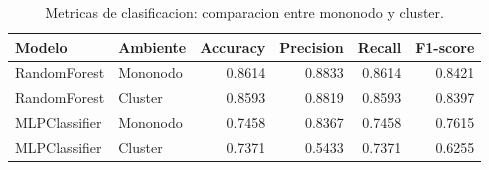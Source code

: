 \begin{table}[H]
    \centering
    \caption{Metricas de clasificacion: comparacion entre mononodo y cluster.}
    \label{tab:classification}
    \begin{tabular}{llrrrr}
        \toprule
        \textbf{Modelo} & \textbf{Ambiente} & \textbf{Accuracy} & \textbf{Precision} & \textbf{Recall} & \textbf{F1-score} \\
        \midrule
        RandomForest & Mononodo & 0.8614 & 0.8833 & 0.8614 & 0.8421 \\
        RandomForest & Cluster & 0.8593 & 0.8819 & 0.8593 & 0.8397 \\
        MLPClassifier & Mononodo & 0.7458 & 0.8367 & 0.7458 & 0.7615 \\
        MLPClassifier & Cluster & 0.7371 & 0.5433 & 0.7371 & 0.6255 \\
        \bottomrule
    \end{tabular}
\end{table}

